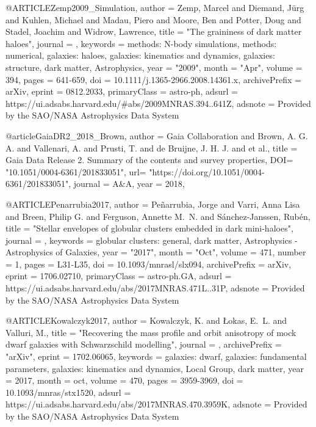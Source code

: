 \documentclass[apj]{emulateapj}
\begin{document}
{{@ARTICLE{Zemp2009_Simulation,
       author = {{Zemp}, Marcel and {Diemand}, J{\"u}rg and {Kuhlen}, Michael and
         {Madau}, Piero and {Moore}, Ben and {Potter}, Doug and
         {Stadel}, Joachim and {Widrow}, Lawrence},
        title = "{The graininess of dark matter haloes}",
      journal = {\mnras},
     keywords = {methods: N-body simulations, methods: numerical, galaxies: haloes, galaxies: kinematics and dynamics, galaxies: structure, dark matter, Astrophysics},
         year = "2009",
        month = "Apr",
       volume = {394},
        pages = {641-659},
          doi = {10.1111/j.1365-2966.2008.14361.x},
archivePrefix = {arXiv},
       eprint = {0812.2033},
 primaryClass = {astro-ph},
       adsurl = {https://ui.adsabs.harvard.edu/\#abs/2009MNRAS.394..641Z},
      adsnote = {Provided by the SAO/NASA Astrophysics Data System}
}




@article{GaiaDR2_2018_Brown,
	author = {{Gaia Collaboration} and {Brown, A. G. A.} and {Vallenari, A.} and {Prusti, T.} and {de Bruijne, J. H. J.} and {et al.}},
	title = {Gaia Data Release 2. Summary of the contents and survey properties},
	DOI= "10.1051/0004-6361/201833051",
	url= "https://doi.org/10.1051/0004-6361/201833051",
	journal = {A\&A},
	year = 2018,
}


@ARTICLE{Penarrubia2017,
       author = {{Pe{\~n}arrubia}, Jorge and {Varri}, Anna Lisa and {Breen}, Philip G. and
         {Ferguson}, Annette M.~N. and {S{\'a}nchez-Janssen}, Rub{\'e}n},
        title = "{Stellar envelopes of globular clusters embedded in dark mini-haloes}",
      journal = {\mnras},
     keywords = {globular clusters: general, dark matter, Astrophysics - Astrophysics of Galaxies},
         year = "2017",
        month = "Oct",
       volume = {471},
       number = {1},
        pages = {L31-L35},
          doi = {10.1093/mnrasl/slx094},
archivePrefix = {arXiv},
       eprint = {1706.02710},
 primaryClass = {astro-ph.GA},
       adsurl = {https://ui.adsabs.harvard.edu/abs/2017MNRAS.471L..31P},
      adsnote = {Provided by the SAO/NASA Astrophysics Data System}
}



@ARTICLE{Kowalczyk2017,
   author = {{Kowalczyk}, K. and {{\L}okas}, E.~L. and {Valluri}, M.},
    title = "{Recovering the mass profile and orbit anisotropy of mock dwarf galaxies with Schwarzschild modelling}",
  journal = {\mnras},
archivePrefix = "arXiv",
   eprint = {1702.06065},
 keywords = {galaxies: dwarf, galaxies: fundamental parameters, galaxies: kinematics and dynamics, Local Group, dark matter},
     year = 2017,
    month = oct,
   volume = 470,
    pages = {3959-3969},
      doi = {10.1093/mnras/stx1520},
   adsurl = {https://ui.adsabs.harvard.edu/abs/2017MNRAS.470.3959K},
  adsnote = {Provided by the SAO/NASA Astrophysics Data System}
}


}}
\end{document}
